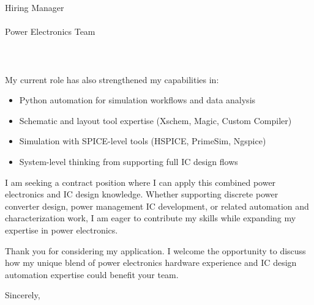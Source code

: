 \documentclass[11pt,a4paper]{letter}
\begin{document}
\begin{letter}{
    Hiring Manager\\\\
    Power Electronics Team\\\\
    [Company Name]\\\\
    [Company Address]
}
My current role has also strengthened my capabilities in:
\begin{itemize}
    \item Python automation for simulation workflows and data analysis
    \item Schematic and layout tool expertise (Xschem, Magic, Custom Compiler)
    \item Simulation with SPICE-level tools (HSPICE, PrimeSim, Ngspice)
    \item System-level thinking from supporting full IC design flows
\end{itemize}

I am seeking a contract position where I can apply this combined power electronics and IC design knowledge. Whether supporting discrete power converter design, power management IC development, or related automation and characterization work, I am eager to contribute my skills while expanding my expertise in power electronics.

Thank you for considering my application. I welcome the opportunity to discuss how my unique blend of power electronics hardware experience and IC design automation expertise could benefit your team.

\closing{Sincerely,}

\end{letter}
\end{document}
